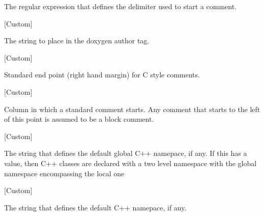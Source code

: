 \begin{doc-string}
The regular expression that defines the delimiter used to start
a comment.
\end{doc-string}

\vspace{1em}
\noindent
{}
\usebox{\funcname}
 \hfill [Custom]

\begin{doc-string}
The string to place in the doxygen author tag.
\end{doc-string}

\vspace{1em}
\noindent
{}
\usebox{\funcname}
 \hfill [Custom]

\begin{doc-string}
Standard end point (right hand margin) for C style comments.
\end{doc-string}

\vspace{1em}
\noindent
{}
\usebox{\funcname}
 \hfill [Custom]

\begin{doc-string}
Column in which a standard comment starts.  Any comment that starts to the left of
this point is assumed to be a block comment.
\end{doc-string}

\vspace{1em}
\noindent
{}
\usebox{\funcname}
 \hfill [Custom]

\begin{doc-string}
The string that defines the default global C++ namepace, if any.
If this has a value, then C++ classes are declared with a two level
namespace with the global namespace encompassing the local one
\end{doc-string}

\vspace{1em}
\noindent
{}
\usebox{\funcname}
 \hfill [Custom]

\begin{doc-string}
The string that defines the default C++ namepace, if any.
\end{doc-string}

